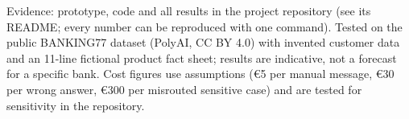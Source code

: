 \documentclass[10pt,a4paper]{article}
\begin{document}
\vfill
{\footnotesize\color{cgray} Evidence: prototype, code and all results in the project repository (see its README;
every number can be reproduced with one command). Tested on the public BANKING77 dataset (PolyAI, CC BY 4.0) with invented customer
data and an 11-line fictional product fact sheet; results are indicative, not a forecast for a specific bank. Cost
figures use assumptions (\euro5 per manual message, \euro30 per wrong answer, \euro300 per misrouted sensitive
case) and are tested for sensitivity in the repository.}
\end{document}
